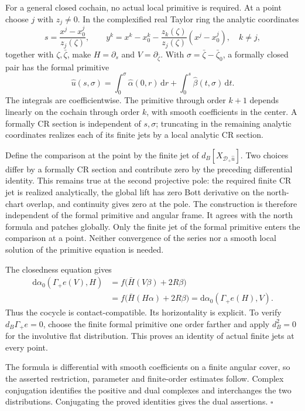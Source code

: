 \documentclass[
  english,
  11pt,
  reqno]{amsart}
\begin{document}
For a general closed cochain, no actual local primitive is required. At
a point choose \(j\) with \(z_j\ne0\). In the complexified real Taylor
ring the analytic coordinates \[
s=\frac{x^j-x_0^j}{z_j(\zeta)},\qquad
y^k=x^k-x_0^k-\frac{z_k(\zeta)}{z_j(\zeta)}(x^j-x_0^j),
\quad k\ne j,
\] together with \(\zeta,\bar\zeta\), make \(H=\partial_s\) and
\(V=\partial_{\bar\zeta}\). With \(\sigma=\bar\zeta-\bar\zeta_0\), a
formally closed pair has the formal primitive%
 \[
\widehat u(s,\sigma)
=\int_0^\sigma\widehat\alpha(0,r)\,\mathrm dr
 +\int_0^s\widehat\beta(t,\sigma)\,\mathrm dt.
\] The integrals are coefficientwise. The primitive through order
\(k+1\) depends linearly on the cochain through order \(k\), with smooth
coefficients in the center. A formally CR section is independent of
\(s,\sigma\); truncating in the remaining analytic coordinates realizes
each of its finite jets by a local analytic CR section.

Define the comparison at the point by the finite jet of
\(d_B[X_{\mathcal D_+\widehat u}]\). Two choices differ by a formally CR
section and contribute zero by the preceding differential identity. This
remains true at the second projective pole: the required finite CR jet
is realized analytically, the global lift has zero Bott derivative on
the north-chart overlap, and continuity gives zero at the pole. The
construction is therefore independent of the formal primitive and
angular frame. It agrees with the north formula and patches globally.
Only the finite jet of the formal primitive enters the comparison at a
point. Neither convergence of the series nor a smooth local solution of
the primitive equation is needed.

The closedness equation gives \[
\begin{aligned}
\mathrm d\alpha_0(\Gamma_+e(V),H)
&=f\bigl(\bar H(V\beta)+2R\beta\bigr)\\
&=f\bigl(\bar H(H\alpha)+2R\beta\bigr)
=\mathrm d\alpha_0(\Gamma_+e(H),V).
\end{aligned}
\] Thus the cocycle is contact-compatible. Its horizontality is
explicit. To verify \(d_B\Gamma_+e=0\), choose the finite formal
primitive one order farther and apply \(d_B^2=0\) for the involutive
flat distribution. This proves an identity of actual finite jets at
every point.

The formula is differential with smooth coefficients on a finite angular
cover, so the asserted restriction, parameter and finite-order estimates
follow. Complex conjugation identifies the positive and dual complexes
and interchanges the two distributions. Conjugating the proved
identities gives the dual assertions. \hfill\(\square\)
\end{document}
